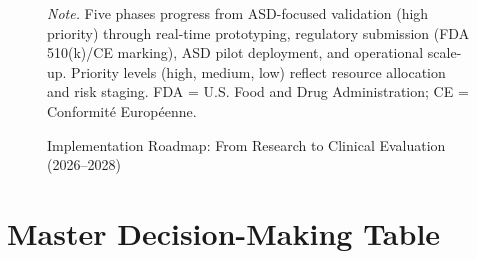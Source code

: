 \begin{figure}[!htbp]
{%
    }
    \caption[Implementation Roadmap (2026--2028)]{Implementation Roadmap: From Research to Clinical Evaluation (2026--2028)}
    \label{fig:implementation_roadmap_app2}
    \vspace{0.5em}\noindent\textit{Note.} Five phases progress from ASD-focused validation (high priority) through real-time prototyping, regulatory submission (FDA 510(k)/CE marking), ASD pilot deployment, and operational scale-up. Priority levels (high, medium, low) reflect resource allocation and risk staging. FDA = U.S. Food and Drug Administration; CE = Conformit\'{e} Europ\'{e}enne.
\end{figure}


\section*{Master Decision-Making Table}
\label{sec:app_ch5_tab_ch5_master_decision}


